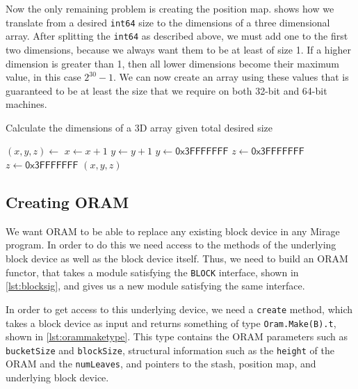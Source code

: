 \documentclass[12pt,a4paper,twoside,openright]{report}
\begin{document}
Now the only remaining problem is creating the position map.  shows how we translate from a desired \texttt{int64} size to the dimensions of a three dimensional array. After splitting the \texttt{int64} as described above, we must add one to the first two dimensions, because we always want them to be at least of size 1. If a higher dimension is greater than 1, then all lower dimensions become their maximum value, in this case $2^{30}-1$. We can now create an array using these values that is guaranteed to be at least the size that we require on both 32-bit and 64-bit machines.

\begin{algorithm}[t]
\caption{Calculate the dimensions of a 3D array given total desired size}
\label{alg:posmapdims}
\footnotesize
\begin{algorithmic}[1]
\vskip 10pt
\vskip 10pt
\vskip 10pt
	\State $(x, y, z) \gets$ 
\vskip 10pt
	\State $x \gets x + 1$
	\State $y \gets y + 1$
\vskip 10pt
		\State $y \gets \mathsf{0x3FFFFFFF}$
		\State $z \gets \mathsf{0x3FFFFFFF}$
		\State $z \gets \mathsf{0x3FFFFFFF}$
	\EndIf
\vskip 10pt
	\State \Return $(x,y,z)$
\vskip 10pt
\EndFunction
\vskip 10pt
\end{algorithmic}
\end{algorithm}

\subsection{Creating ORAM}

We want ORAM to be able to replace any existing block device in any Mirage program. In order to do this we need access to the methods of the underlying block device as well as the block device itself. Thus, we need to build an ORAM functor, that takes a module satisfying the \texttt{BLOCK} interface, shown in \cref{lst:blocksig}, and gives us a new module satisfying the same interface.

In order to get access to this underlying device, we need a \texttt{create} method, which takes a block device as input and returns something of type \texttt{Oram.Make(B).t}, shown in \cref{lst:orammaketype}. This type contains the ORAM parameters such as \texttt{bucketSize} and \texttt{blockSize}, structural information such as the \texttt{height} of the ORAM and the \texttt{numLeaves}, and pointers to the stash, position map, and underlying block device.
\end{document}
